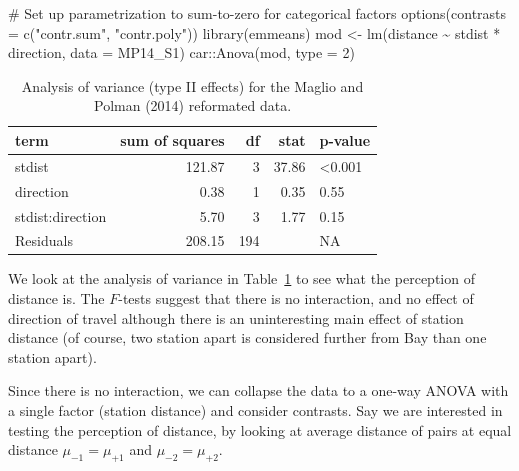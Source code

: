 \documentclass[
  11pt,
  letterpaper,
]{scrbook}
\newenvironment{Shaded}{\begin{snugshade}}{\end{snugshade}}
\newcommand{\AttributeTok}[1]{\textcolor[rgb]{0.40,0.45,0.13}{#1}}
\newcommand{\CommentTok}[1]{\textcolor[rgb]{0.37,0.37,0.37}{#1}}
\newcommand{\DecValTok}[1]{\textcolor[rgb]{0.68,0.00,0.00}{#1}}
\newcommand{\FunctionTok}[1]{\textcolor[rgb]{0.28,0.35,0.67}{#1}}
\newcommand{\NormalTok}[1]{\textcolor[rgb]{0.00,0.23,0.31}{#1}}
\newcommand{\OtherTok}[1]{\textcolor[rgb]{0.00,0.23,0.31}{#1}}
\newcommand{\SpecialCharTok}[1]{\textcolor[rgb]{0.37,0.37,0.37}{#1}}
\newcommand{\StringTok}[1]{\textcolor[rgb]{0.13,0.47,0.30}{#1}}
\theoremstyle{definition}
\theoremstyle{remark}
\begin{document}
\begin{Shaded}
\begin{Highlighting}[]
\CommentTok{\# Set up parametrization to sum{-}to{-}zero for categorical factors}
\FunctionTok{options}\NormalTok{(}\AttributeTok{contrasts =} \FunctionTok{c}\NormalTok{(}\StringTok{"contr.sum"}\NormalTok{, }\StringTok{"contr.poly"}\NormalTok{))}
\FunctionTok{library}\NormalTok{(emmeans)}
\NormalTok{mod }\OtherTok{\textless{}{-}} \FunctionTok{lm}\NormalTok{(distance }\SpecialCharTok{\textasciitilde{}}\NormalTok{ stdist }\SpecialCharTok{*}\NormalTok{ direction, }\AttributeTok{data =}\NormalTok{ MP14\_S1) }
\NormalTok{car}\SpecialCharTok{::}\FunctionTok{Anova}\NormalTok{(mod, }\AttributeTok{type =} \DecValTok{2}\NormalTok{)}
\end{Highlighting}
\end{Shaded}

\hypertarget{tbl-ANOVA2-MP14}{}
\begin{table}
\caption{\label{tbl-ANOVA2-MP14}Analysis of variance (type II effects) for the Maglio and Polman (2014)
reformated data. }\tabularnewline

\centering
\begin{tabular}{lrrrl}
\toprule
term & sum of squares & df & stat & p-value\\
\midrule
stdist & 121.87 & 3 & 37.86 & <0.001\\
direction & 0.38 & 1 & 0.35 & 0.55\\
stdist:direction & 5.70 & 3 & 1.77 & 0.15\\
Residuals & 208.15 & 194 &  & NA\\
\bottomrule
\end{tabular}
\end{table}

We look at the analysis of variance in Table~\ref{tbl-ANOVA2-MP14} to
see what the perception of distance is. The \(F\)-tests suggest that
there is no interaction, and no effect of direction of travel although
there is an uninteresting main effect of station distance (of course,
two station apart is considered further from Bay than one station
apart).

Since there is no interaction, we can collapse the data to a one-way
ANOVA with a single factor (station distance) and consider contrasts.
Say we are interested in testing the perception of distance, by looking
at average distance of pairs at equal distance \(\mu_{-1} = \mu_{+1}\)
and \(\mu_{-2} = \mu_{+2}\).
\end{document}
